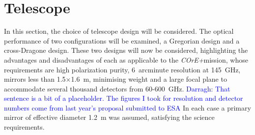 \documentclass[11pt,a4paper]{article}
\newcommand{\comblue}[1]{\textcolor{blue}{#1}}
\newcommand{\coreplus}{\textit{\negthinspace COrE+\/}}
\begin{document}
\section{Telescope}
In this section, the choice of telescope design will be considered. The optical performance of two configurations will be examined, a Gregorian design and a cross-Dragone design. These two designs will now be considered, highlighting the advantages and disadvantages of each as applicable to the \coreplus mission, whose requirements are high polarization purity, 6~arcminute resolution at 145~GHz, mirrors less than 1.5$\times$1.6~m, minimising weight and a large focal plane to accommodate several thousand detectors from 60-600~GHz. \comblue{Darragh: That sentence is a bit of a placeholder. The figures I took for resolution and detector numbers come from last year's proposal submitted to ESA} In each case a primary mirror of effective diameter 1.2~m was assumed, satisfying the science requirements.
\end{document}

